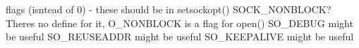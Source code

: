 
\begin{DoxyRefList}
\item[Member \mbox{\hyperlink{classTcpSocket_a132aa72af141d611f8bad96ba585a79f}{Tcp\+Socket\+::Tcp\+Socket}} ()]\label{todo__todo000003}%
%
flags (isntead of 0) -\/ these should be in setsockopt() SOCK\+\_\+\+NONBLOCK? There\textquotesingle{}s no define for it, O\+\_\+\+NONBLOCK is a flag for open() SO\+\_\+\+DEBUG might be useful SO\+\_\+\+REUSEADDR might be useful SO\+\_\+\+KEEPALIVE might be useful 
\end{DoxyRefList}